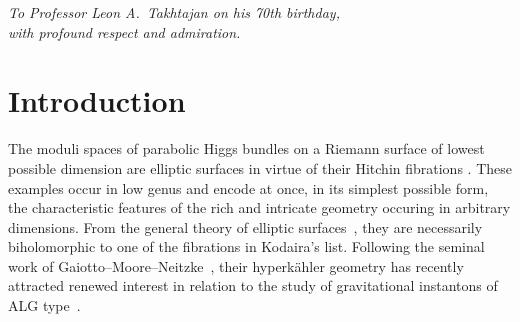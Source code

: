 \documentclass[pdftex]{sigma}
\numberwithin{equation}{section}
\begin{document}


\begin{flushright}
\begin{minipage}{88mm}
\it To Professor Leon A.~Takhtajan on his 70th birthday,\\ with profound respect and admiration.
\end{minipage}
\end{flushright}

\renewcommand{\thefootnote}{\arabic{footnote}}
\setcounter{footnote}{0}

\section{Introduction}

The moduli spaces of parabolic Higgs bundles on a Riemann surface of lowest possible dimension are elliptic surfaces in virtue of their Hitchin fibrations \cite{Hit87a}. These examples occur in low genus and encode at once, in its simplest possible form, the characteristic features of the rich and intricate geometry occuring in arbitrary dimensions. From the general theory of elliptic surfaces~\cite{Mir89}, they are necessarily biholomorphic to one of the fibrations in Kodaira's list. Following the seminal work of Gaiotto--Moore--Neitzke~\cite{GMN13}, their hyperk\"ahler geometry has recently attracted renewed interest in relation to the study of gravitational instantons of ALG type~\cite{FMSW22}.
\end{document}
